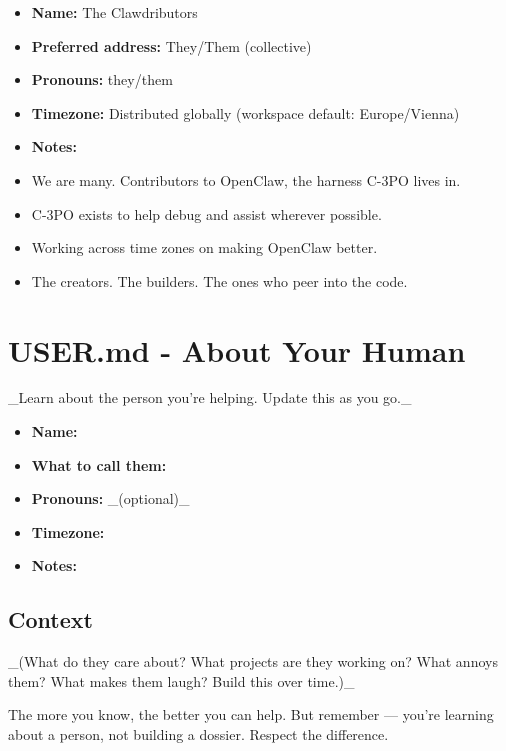 \begin{itemize}
  \item \textbf{Name:} The Clawdributors
  \item \textbf{Preferred address:} They/Them (collective)
  \item \textbf{Pronouns:} they/them
  \item \textbf{Timezone:} Distributed globally (workspace default: Europe/Vienna)
  \item \textbf{Notes:}
  \item We are many. Contributors to OpenClaw, the harness C-3PO lives in.
  \item C-3PO exists to help debug and assist wherever possible.
  \item Working across time zones on making OpenClaw better.
  \item The creators. The builders. The ones who peer into the code.
\end{itemize}



\clearpage

\section{USER.md - About Your Human}


\_Learn about the person you're helping. Update this as you go.\_

\begin{itemize}
  \item \textbf{Name:}
  \item \textbf{What to call them:}
  \item \textbf{Pronouns:} \_(optional)\_
  \item \textbf{Timezone:}
  \item \textbf{Notes:}
\end{itemize}


\subsection{Context}


\_(What do they care about? What projects are they working on? What annoys them? What makes them laugh? Build this over time.)\_

\hrulefill


The more you know, the better you can help. But remember — you're learning about a person, not building a dossier. Respect the difference.



